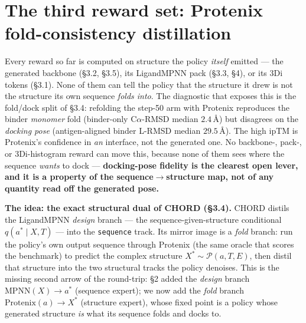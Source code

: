 \documentclass[11pt]{article}
\newcommand{\ttk}[1]{\texttt{\small #1}}
\begin{document}
\section{The third reward set: Protenix fold-consistency distillation}
\label{sec:protenix-sft}
Every reward so far is computed on structure the policy \emph{itself} emitted --- the generated
backbone (\S3.2, \S3.5), its LigandMPNN pack (\S3.3, \S4), or its 3Di tokens (\S3.1). None of them
can tell the policy that the structure it drew is not the structure its own sequence \emph{folds
into}. The diagnostic that exposes this is the fold/dock split of \S3.4: refolding the step-50 arm
with Protenix reproduces the binder \emph{monomer} fold (binder-only C$\alpha$-RMSD median
$2.4$\,\AA) but disagrees on the \emph{docking pose} (antigen-aligned binder L-RMSD median
$29.5$\,\AA). The high ipTM is Protenix's confidence in \emph{an} interface, not the generated one.
No backbone-, pack-, or 3Di-histogram reward can move this, because none of them sees where the
sequence \emph{wants} to dock --- \textbf{docking-pose fidelity is the clearest open lever, and it is
a property of the sequence$\to$structure map, not of any quantity read off the generated pose.}

\textbf{The idea: the exact structural dual of CHORD (\S3.4).} CHORD distils the LigandMPNN
\emph{design} branch --- the sequence-given-structure conditional $q(a^{\ast}\!\mid\!X,T)$ --- into
the \ttk{sequence} track. Its mirror image is a \emph{fold} branch: run the policy's own output
sequence through Protenix (the same oracle that scores the benchmark) to predict the complex
structure $X^{\ast}\!\sim\!\mathcal P(a,T,E)$, then distil that structure into the two structural
tracks the policy denoises. This is the missing second arrow of the round-trip: \S2 added the
\emph{design} branch $\mathrm{MPNN}(X)\!\to\!a^{\ast}$ (sequence expert); we now add the \emph{fold}
branch $\mathrm{Protenix}(a)\!\to\!X^{\ast}$ (structure expert), whose fixed point is a policy whose
generated structure \emph{is} what its sequence folds and docks to.
\end{document}
